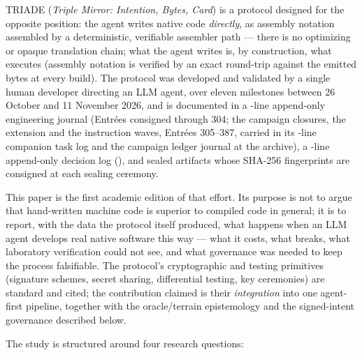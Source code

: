 \documentclass[10pt,a4paper]{article}
\begin{document}
TRIADE (\emph{Triple Mirror: Intention, Bytes, Card}) is a protocol
designed for the opposite position: the agent writes native code
\emph{directly}, as assembly notation assembled by a deterministic,
verifiable assembler path --- there is no optimizing or opaque translation
chain; what the agent writes is, by construction, what executes
(assembly notation is verified by an exact round-trip against the emitted
bytes at every build). The protocol was developed and validated by a
single human developer directing an LLM agent, over eleven milestones
between 26 October and 11 November 2026, and is documented in a
\nbLignesJournal-line append-only engineering journal (Entr\'ees
consigned through 304; the campaign closures, the extension and the
instruction waves, Entr\'ees 305--387,
carried in its \nbLignesWorklog-line companion task log and the campaign
ledger journal at the archive), a \nbLignesDecisions-line append-only
decision log (\plageDecisions), and sealed artifacts whose
SHA-256 fingerprints are consigned at each sealing ceremony.

This paper is the first academic edition of that effort. Its purpose is
not to argue that hand-written machine code is superior to compiled code
in general; it is to report, with the data the protocol itself produced,
what happens when an LLM agent develops real native software this way ---
what it costs, what breaks, what laboratory verification could not see,
and what governance was needed to keep the process falsifiable. The
protocol's cryptographic and testing primitives (signature schemes,
secret sharing, differential testing, key ceremonies) are standard and
cited; the contribution claimed is their \emph{integration} into one
agent-first pipeline, together with the oracle/terrain epistemology and
the signed-intent governance described below.

The study is structured around four research questions:
\end{document}
